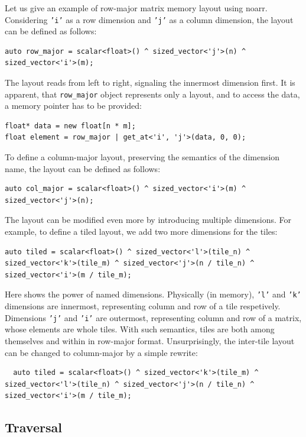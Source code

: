 Let us give an example of row-major matrix memory layout using noarr. Considering \texttt{'i'} as a row dimension and \texttt{'j'} as a column dimension, the layout can be defined as follows:
\begin{verbatim}
auto row_major = scalar<float>() ^ sized_vector<'j'>(n) ^ sized_vector<'i'>(m);
\end{verbatim}
The layout reads from left to right, signaling the innermost dimension first. 
It is apparent, that \texttt{row_major} object represents only a layout, and to access the data, a memory pointer has to be provided:
\begin{verbatim}
float* data = new float[n * m];
float element = row_major | get_at<'i', 'j'>(data, 0, 0);
\end{verbatim}
To define a column-major layout, preserving the semantics of the dimension name, the layout can be defined as follows:
\begin{verbatim}
auto col_major = scalar<float>() ^ sized_vector<'i'>(m) ^ sized_vector<'j'>(n);
\end{verbatim}
The layout can be modified even more by introducing multiple dimensions. For example, to define a tiled layout, we add two more dimensions for the tiles:
\begin{verbatim}
auto tiled = scalar<float>() ^ sized_vector<'l'>(tile_n) ^ sized_vector<'k'>(tile_m) ^ sized_vector<'j'>(n / tile_n) ^ sized_vector<'i'>(m / tile_m);
\end{verbatim}
Here shows the power of named dimensions. Physically (in memory), \texttt{'l'} and \texttt{'k'} dimensions are innermost, representing column and row of a tile respetively. Dimensions \texttt{'j'} and \texttt{'i'} are outermost, representing column and row of a matrix, whose elements are whole tiles. With such semantics, tiles are both among themselves and within in row-major format. Unsurprisingly, the inter-tile layout can be changed to column-major by a simple rewrite: 
\begin{verbatim}
  auto tiled = scalar<float>() ^ sized_vector<'k'>(tile_m) ^ sized_vector<'l'>(tile_n) ^ sized_vector<'j'>(n / tile_n) ^ sized_vector<'i'>(m / tile_m);
\end{verbatim}


\subsection{Traversal}

